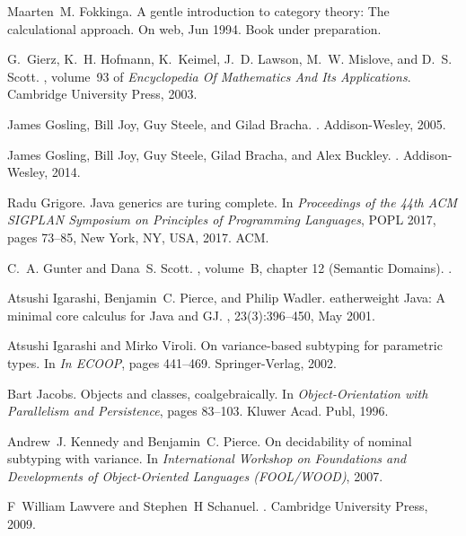 \documentclass[twocolumn,english]{article}
\numberwithin{equation}{section}
\numberwithin{figure}{section}
\begin{document}
\begin{thebibliography}{10}
	Maarten~M. Fokkinga.
	\newblock A gentle introduction to category theory: The calculational approach.
	\newblock On web, Jun 1994.
	\newblock Book under preparation.
	
	G.~Gierz, K.~H. Hofmann, K.~Keimel, J.~D. Lawson, M.~W. Mislove, and D.~S.
	Scott.
	, volume~93 of {\em Encyclopedia
		Of Mathematics And Its Applications}.
	\newblock Cambridge University Press, 2003.
	
	James Gosling, Bill Joy, Guy Steele, and Gilad Bracha.
	.
	\newblock Addison-Wesley, 2005.
	
	James Gosling, Bill Joy, Guy Steele, Gilad Bracha, and Alex Buckley.
	.
	\newblock Addison-Wesley, 2014.
	
	Radu Grigore.
	\newblock Java generics are turing complete.
	\newblock In {\em Proceedings of the 44th ACM SIGPLAN Symposium on Principles
		of Programming Languages}, POPL 2017, pages 73--85, New York, NY, USA, 2017.
	ACM.
	
	C.~A. Gunter and Dana~S. Scott.
	, volume~B, chapter 12
	(Semantic Domains).
	.
	
	Atsushi Igarashi, Benjamin~C. Pierce, and Philip Wadler.
	eatherweight {J}ava: A minimal core calculus for {J}ava and {GJ}.
	,
	23(3):396--450, May 2001.
	
	Atsushi Igarashi and Mirko Viroli.
	\newblock On variance-based subtyping for parametric types.
	\newblock In {\em In ECOOP}, pages 441--469. Springer-Verlag, 2002.
	
	Bart Jacobs.
	\newblock Objects and classes, coalgebraically.
	\newblock In {\em Object-Orientation with Parallelism and Persistence}, pages
	83--103. Kluwer Acad. Publ, 1996.
	
	Andrew~J. Kennedy and Benjamin~C. Pierce.
	\newblock On decidability of nominal subtyping with variance.
	\newblock In {\em International Workshop on Foundations and Developments of
		Object-Oriented Languages (FOOL/WOOD)}, 2007.
	
	F~William Lawvere and Stephen~H Schanuel.
	.
	\newblock Cambridge University Press, 2009.
	

\end{thebibliography}
\end{document}
